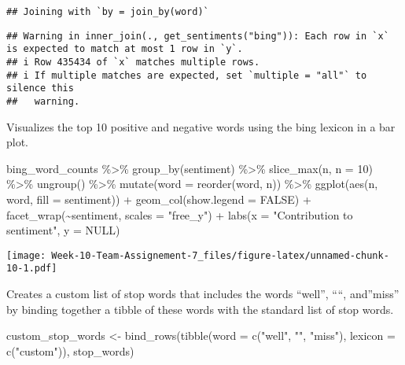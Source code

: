 \documentclass[
]{article}
\newenvironment{Shaded}{\begin{snugshade}}{\end{snugshade}}
\newcommand{\AttributeTok}[1]{\textcolor[rgb]{0.77,0.63,0.00}{#1}}
\newcommand{\ConstantTok}[1]{\textcolor[rgb]{0.00,0.00,0.00}{#1}}
\newcommand{\DecValTok}[1]{\textcolor[rgb]{0.00,0.00,0.81}{#1}}
\newcommand{\FunctionTok}[1]{\textcolor[rgb]{0.00,0.00,0.00}{#1}}
\newcommand{\NormalTok}[1]{#1}
\newcommand{\OtherTok}[1]{\textcolor[rgb]{0.56,0.35,0.01}{#1}}
\newcommand{\SpecialCharTok}[1]{\textcolor[rgb]{0.00,0.00,0.00}{#1}}
\newcommand{\StringTok}[1]{\textcolor[rgb]{0.31,0.60,0.02}{#1}}
\begin{document}
\begin{verbatim}
## Joining with `by = join_by(word)`
\end{verbatim}

\begin{verbatim}
## Warning in inner_join(., get_sentiments("bing")): Each row in `x` is expected to match at most 1 row in `y`.
## i Row 435434 of `x` matches multiple rows.
## i If multiple matches are expected, set `multiple = "all"` to silence this
##   warning.
\end{verbatim}

Visualizes the top 10 positive and negative words using the bing lexicon
in a bar plot.

\begin{Shaded}
\begin{Highlighting}[]
\NormalTok{bing\_word\_counts }\SpecialCharTok{\%\textgreater{}\%}
  \FunctionTok{group\_by}\NormalTok{(sentiment) }\SpecialCharTok{\%\textgreater{}\%}
  \FunctionTok{slice\_max}\NormalTok{(n, }\AttributeTok{n =} \DecValTok{10}\NormalTok{) }\SpecialCharTok{\%\textgreater{}\%} 
  \FunctionTok{ungroup}\NormalTok{() }\SpecialCharTok{\%\textgreater{}\%}
  \FunctionTok{mutate}\NormalTok{(}\AttributeTok{word =} \FunctionTok{reorder}\NormalTok{(word, n)) }\SpecialCharTok{\%\textgreater{}\%}
  \FunctionTok{ggplot}\NormalTok{(}\FunctionTok{aes}\NormalTok{(n, word, }\AttributeTok{fill =}\NormalTok{ sentiment)) }\SpecialCharTok{+}
  \FunctionTok{geom\_col}\NormalTok{(}\AttributeTok{show.legend =} \ConstantTok{FALSE}\NormalTok{) }\SpecialCharTok{+}
  \FunctionTok{facet\_wrap}\NormalTok{(}\SpecialCharTok{\textasciitilde{}}\NormalTok{sentiment, }\AttributeTok{scales =} \StringTok{"free\_y"}\NormalTok{) }\SpecialCharTok{+}
  \FunctionTok{labs}\NormalTok{(}\AttributeTok{x =} \StringTok{"Contribution to sentiment"}\NormalTok{,}
       \AttributeTok{y =} \ConstantTok{NULL}\NormalTok{)}
\end{Highlighting}
\end{Shaded}

\texttt{[image: Week-10-Team-Assignement-7\_files/figure-latex/unnamed-chunk-10-1.pdf]}

Creates a custom list of stop words that includes the words ``well'',
````, and''miss'' by binding together a tibble of these words with the
standard list of stop words.

\begin{Shaded}
\begin{Highlighting}[]
\NormalTok{custom\_stop\_words }\OtherTok{\textless{}{-}} \FunctionTok{bind\_rows}\NormalTok{(}\FunctionTok{tibble}\NormalTok{(}\AttributeTok{word =} \FunctionTok{c}\NormalTok{(}\StringTok{"well"}\NormalTok{, }\StringTok{""}\NormalTok{, }\StringTok{"miss"}\NormalTok{),  }
                                      \AttributeTok{lexicon =} \FunctionTok{c}\NormalTok{(}\StringTok{"custom"}\NormalTok{)), }
\NormalTok{                               stop\_words)}
\end{Highlighting}
\end{Shaded}
\end{document}
